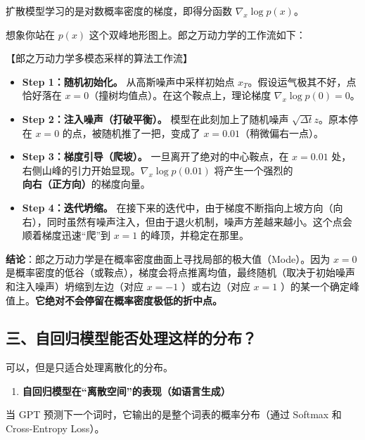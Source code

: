 扩散模型学习的是对数概率密度的梯度，即得分函数 \(\nabla_x\log p(x)\)。

想象你站在 \(p(x)\) 这个双峰地形图上。郎之万动力学的工作流如下：

【郎之万动力学多模态采样的算法工作流】

\begin{itemize}
\tightlist
\item
  \textbf{Step 1：随机初始化。} 从高斯噪声中采样初始点 \(x_T\)。假设运气极其不好，点恰好落在 \(x=0\)（撞树均值点）。在这个鞍点上，理论梯度 \(\nabla_x\log p(0)=0\)。
\item
  \textbf{Step 2：注入噪声（打破平衡）。} 模型在此刻加上了随机噪声 \(\sqrt{\Delta t}z\)。原本停在 \(x=0\) 的点，被随机推了一把，变成了 \(x=0.01\)（稍微偏右一点）。
\item
  \textbf{Step 3：梯度引导（爬坡）。} 一旦离开了绝对的中心鞍点，在 \(x=0.01\) 处，右侧山峰的引力开始显现。\(\nabla_x\log p(0.01)\) 将产生一个强烈的\textbf{向右（正方向）}的梯度向量。
\item
  \textbf{Step 4：迭代坍缩。} 在接下来的迭代中，由于梯度不断指向上坡方向（向右），同时虽然有噪声注入，但由于退火机制，噪声方差越来越小。这个点会顺着梯度迅速``爬''到 \(x=1\) 的峰顶，并稳定在那里。
\end{itemize}

\textbf{结论}：郎之万动力学是在概率密度曲面上寻找局部的极大值（Mode）。因为 \(x=0\) 是概率密度的低谷（或鞍点），梯度会将点推离均值，最终随机（取决于初始噪声和注入噪声）坍缩到左边（对应 \(x=-1\) ）或右边（对应 \(x=1\) ）的某一个确定峰值上。\textbf{它绝对不会停留在概率密度极低的折中点。}

\hypertarget{ux4e09ux81eaux56deux5f52ux6a21ux578bux80fdux5426ux5904ux7406ux8fd9ux6837ux7684ux5206ux5e03}{%
\subsection{三、自回归模型能否处理这样的分布？}\label{ux4e09ux81eaux56deux5f52ux6a21ux578bux80fdux5426ux5904ux7406ux8fd9ux6837ux7684ux5206ux5e03}}

可以，但是只适合处理离散化的分布。

\begin{enumerate}
\def\labelenumi{\arabic{enumi}.}
\tightlist
\item
  \textbf{自回归模型在``离散空间''的表现（如语言生成）}
\end{enumerate}

当 GPT 预测下一个词时，它输出的是整个词表的概率分布（通过 Softmax 和 Cross-Entropy Loss）。

